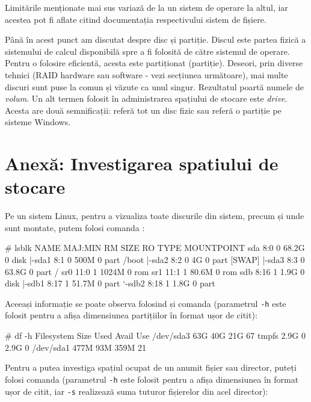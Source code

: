 Limitările menționate mai sus variază de la un sistem de operare la altul, iar
acestea pot fi aflate citind documentația respectivului sistem de fișiere.

Până în acest punct am discutat despre disc și partiție. Discul este partea
fizică a sistemului de calcul disponibilă spre a fi folosită de către sistemul
de operare. Pentru o folosire eficientă, acesta este partiționat (partiție).
Deseori, prin diverse tehnici (RAID hardware sau software - vezi secțiunea
următoare), mai multe discuri sunt puse la comun și văzute ca unul singur.
Rezultatul poartă numele de \textit{volum}. Un alt termen folosit în
administrarea spațiului de stocare este \textit{drive}. Acesta are două
semnificații: referă tot un disc fizic sau referă o partiție pe sisteme Windows.

\section{Anexă: Investigarea spatiului de stocare}
\label{sec:storage-investigare}

Pe un sistem Linux, pentru a vizualiza toate discurile din sistem, precum și
unde sunt montate, putem folosi comanda :

\begin{screen}
# lsblk
NAME   MAJ:MIN RM  SIZE RO TYPE MOUNTPOINT
sda      8:0    0 68.2G  0 disk
|-sda1   8:1    0  500M  0 part /boot
|-sda2   8:2    0    4G  0 part [SWAP]
|-sda3   8:3    0 63.8G  0 part /
sr0     11:0    1 1024M  0 rom
sr1     11:1    1 80.6M  0 rom
sdb      8:16   1  1.9G  0 disk
|-sdb1   8:17   1 51.7M  0 part
`-sdb2   8:18   1  1.8G  0 part
\end{screen}

Aceeași informație se poate observa folosind și comanda  (parametrul
\texttt{-h} este folosit pentru a afișa dimensiunea partițiilor în format ușor
de citit):

\begin{screen}
# df -h
Filesystem      Size  Used Avail Use%
/dev/sda3        63G   40G   21G  67%
tmpfs           2.9G     0  2.9G   0%
/dev/sda1       477M   93M  359M  21%
\end{screen}

Pentru a putea investiga spațiul ocupat de un anumit fișier sau director, puteți
folosi comanda  (parametrul \texttt{-h} este folosit pentru a afișa
dimensiunea în format ușor de citit, iar \texttt{-s} realizează suma tuturor
fișierelor din acel director):

